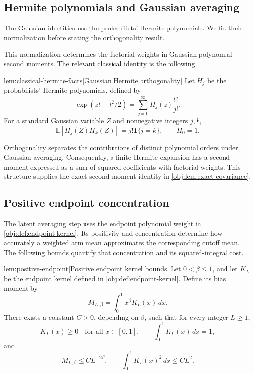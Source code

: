 \documentclass[11pt]{article}
\begin{document}
\subsection{Hermite polynomials and Gaussian averaging}

The Gaussian identities use the probabilists' Hermite polynomials. We fix their normalization before stating the orthogonality result.



This normalization determines the factorial weights in Gaussian polynomial second moments. The relevant classical identity is the following.

\begin{theoremv}{lem:classical-hermite-facts}[Gaussian Hermite orthogonality]
Let \(H_j\) be the probabilists' Hermite polynomials, defined by
\[
\exp(zt-t^2/2)
=\sum_{j=0}^{\infty}H_j(z)\frac{t^j}{j!}.
\]
For a standard Gaussian variable \(Z\) and nonnegative integers \(j,k\),
\[
\mathbb E[H_j(Z)H_k(Z)]
=j!\mathbf1\{j=k\},
\qquad H_0=1.
\]
\end{theoremv}

Orthogonality separates the contributions of distinct polynomial orders under Gaussian averaging. Consequently, a finite Hermite expansion has a second moment expressed as a sum of squared coefficients with factorial weights. This structure supplies the exact second-moment identity in \cref{obj:lem:exact-covariance}.

\subsection{Positive endpoint concentration}

The latent averaging step uses the endpoint polynomial weight in \cref{obj:def:endpoint-kernel}. Its positivity and concentration determine how accurately a weighted arm mean approximates the corresponding cutoff mean. The following bounds quantify that concentration and its squared-integral cost.

\begin{lemmav}{lem:positive-endpoint}[Positive endpoint kernel bounds]
Let \(0<\beta\le1\), and let \(K_L\) be the endpoint kernel defined in \cref{obj:def:endpoint-kernel}. Define its bias moment by
\[
M_{L,\beta}=\int_0^1 x^\beta K_L(x)\,dx.
\]
There exists a constant \(C>0\), depending on \(\beta\), such that for every integer \(L\ge1\),
\[
K_L(x)\ge0\quad\text{for all }x\in[0,1],
\qquad
\int_0^1 K_L(x)\,dx=1,
\]
and
\[
M_{L,\beta}\le C L^{-2\beta},
\qquad
\int_0^1 K_L(x)^2\,dx\le C L^2.
\]
\end{lemmav}
\end{document}
